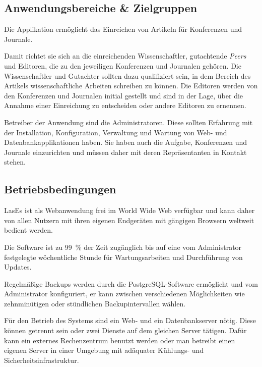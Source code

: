 
\subsection{Anwendungsbereiche \& Zielgruppen}

Die Applikation ermöglicht das Einreichen von Artikeln für Konferenzen und Journale.

Damit richtet sie sich an die einreichenden Wissenschaftler, gutachtende \emph{Peers} und Editoren, die zu den jeweiligen Konferenzen und Journalen gehören.
Die Wissenschaftler und Gutachter sollten dazu qualifiziert sein, in dem Bereich des Artikels wissenschaftliche Arbeiten schreiben zu können.
Die Editoren werden von den Konferenzen und Journalen initial gestellt und sind in der Lage, über die Annahme einer Einreichung zu entscheiden oder andere Editoren zu ernennen.

Betreiber der Anwendung sind die Administratoren.
Diese sollten Erfahrung mit der Installation, Konfiguration, Verwaltung und Wartung von Web- und Datenbankapplikationen haben.
Sie haben auch die Aufgabe, Konferenzen und Journale einzurichten und müssen daher mit deren Repräsentanten in Kontakt stehen.

\subsection{Betriebsbedingungen}

LasEs ist als Webanwendung frei im World Wide Web verfügbar und kann daher von allen Nutzern mit ihren eigenen Endgeräten mit gängigen Browsern weltweit bedient werden.

Die Software ist zu 99~\% der Zeit zugänglich bis auf eine vom Administrator festgelegte wöchentliche Stunde für Wartungsarbeiten und Durchführung von Updates.

Regelmäßige Backups werden durch die PostgreSQL-Software ermöglicht und vom Administrator konfiguriert, er kann zwischen verschiedenen Möglichkeiten wie zehnminütigen oder stündlichen Backupintervallen wählen.

Für den Betrieb des Systems sind ein Web- und ein Datenbankserver nötig.
Diese können getrennt sein oder zwei Dienste auf dem gleichen Server tätigen.
Dafür kann ein externes Rechenzentrum benutzt werden oder man betreibt einen eigenen Server in einer Umgebung mit adäquater Kühlungs- und Sicherheitsinfrastruktur.